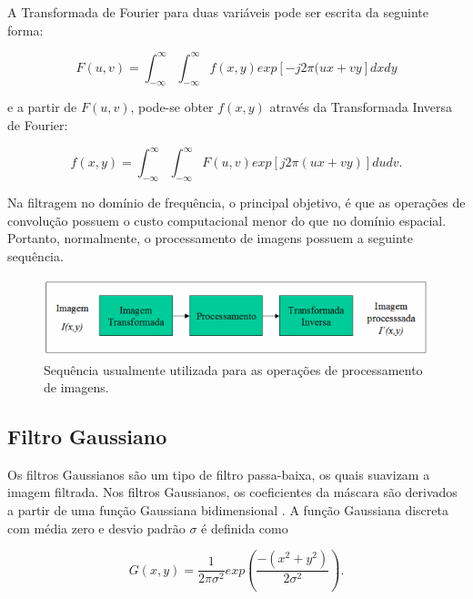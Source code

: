 \documentclass[twoside,twocolumn]{article}
\begin{document}
A Transformada de Fourier para duas variáveis pode ser escrita da seguinte forma:

\begin{equation*}
	F(u,v) = \int_{-\infty}^{\infty} \int_{-\infty}^{\infty} f(x,y)exp\left[-j2\pi(ux + vy\right] dx dy
\end{equation*}

e a partir de $F(u,v)$, pode-se obter $f(x,y)$ através da Transformada Inversa de Fourier:

\begin{equation*}
	f(x,y) =  \int_{-\infty}^{\infty} \int_{-\infty}^{\infty} F(u,v)exp\left[j2\pi(ux + vy)\right] du dv.
\end{equation*}

Na filtragem no domínio de frequência, o principal objetivo, é que as operações de convolução possuem o custo computacional menor do que no domínio espacial. Portanto, normalmente, o processamento de imagens possuem a seguinte sequência.

\begin{figure}[H]
\begin{center}
	\includegraphics[scale=.35]{figures/sequencia_fourier.png}
\caption{Sequência usualmente utilizada para as operações de processamento de imagens.} \label{gdimotes}
\end{center}
\end{figure}

\subsection{Filtro Gaussiano}

Os filtros Gaussianos são um tipo de filtro passa-baixa, os quais suavizam a imagem filtrada. Nos filtros Gaussianos, os coeficientes da máscara são derivados a partir de uma função Gaussiana bidimensional \cite{b2}. A função Gaussiana discreta com média zero e desvio padrão $\sigma$ é definida como

\begin{equation*}
	G(x,y) = \dfrac{1}{2\pi\sigma^{2}}exp\left(\dfrac{-(x^{2} + y^{2})}{2\sigma^{2}}\right).
\end{equation*}
\end{document}
